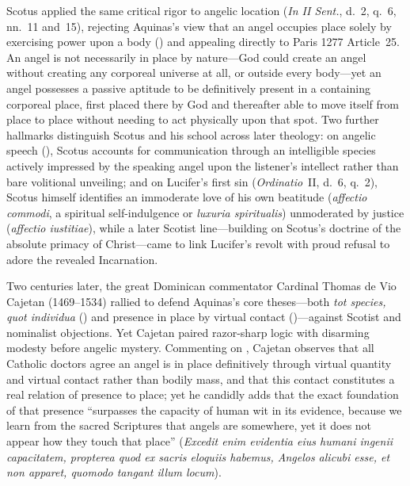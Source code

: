 Scotus applied the same critical rigor to angelic location (\emph{In II Sent.}, d.~2, q.~6, nn.~11 and~15), rejecting Aquinas's view that an angel occupies place solely by exercising power upon a body () and appealing directly to Paris 1277 Article~25. An angel is not necessarily in place by nature---God could create an angel without creating any corporeal universe at all, or outside every body---yet an angel possesses a passive aptitude to be definitively present in a containing corporeal place, first placed there by God and thereafter able to move itself from place to place without needing to act physically upon that spot. Two further hallmarks distinguish Scotus and his school across later theology: on angelic speech (), Scotus accounts for communication through an intelligible species actively impressed by the speaking angel upon the listener's intellect rather than bare volitional unveiling; and on Lucifer's first sin (\emph{Ordinatio}~II, d.~6, q.~2), Scotus himself identifies an immoderate love of his own beatitude (\emph{affectio commodi}, a spiritual self-indulgence or \emph{luxuria spiritualis}) unmoderated by justice (\emph{affectio iustitiae}), while a later Scotist line---building on Scotus's doctrine of the absolute primacy of Christ---came to link Lucifer's revolt with proud refusal to adore the revealed Incarnation.

Two centuries later, the great Dominican commentator Cardinal Thomas de Vio Cajetan (1469--1534) rallied to defend Aquinas's core theses---both \emph{tot species, quot individua} () and presence in place by virtual contact ()---against Scotist and nominalist objections. Yet Cajetan paired razor-sharp logic with disarming modesty before angelic mystery. Commenting on , Cajetan observes that all Catholic doctors agree an angel is in place definitively through virtual quantity and virtual contact rather than bodily mass, and that this contact constitutes a real relation of presence to place; yet he candidly adds that the exact foundation of that presence ``surpasses the capacity of human wit in its evidence, because we learn from the sacred Scriptures that angels are somewhere, yet it does not appear how they touch that place'' (\emph{Excedit enim evidentia eius humani ingenii capacitatem, propterea quod ex sacris eloquiis habemus, Angelos alicubi esse, et non apparet, quomodo tangant illum locum}).

